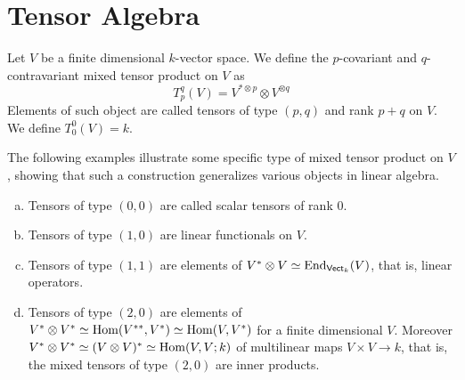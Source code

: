 \section{Tensor Algebra}

\begin{definition}
  Let \(V\) be a finite dimensional \(k\)-vector space. We define the
  \(p\)-covariant and \(q\)-contravariant mixed tensor product on \(V\) as
  \[
    T_p^q(V) = V^{* \otimes p} \otimes V^{\otimes q}
  \]
  Elements of such object are called tensors of type \((p, q)\) and rank \(p +
  q\) on \(V\). We define \(T_0^0(V) = k\).
\end{definition}

\begin{example}
  The following examples illustrate some specific type of mixed tensor product
  on \(V\), showing that such a construction generalizes various objects in
  linear algebra.
  \begin{enumerate}[(a)]
    \item Tensors of type \((0,0)\) are called scalar tensors of rank \(0\).
    \item Tensors of type \((1, 0)\) are linear functionals on \(V\).
    \item Tensors of type \((1, 1)\) are elements of \(V^* \otimes V \simeq
      \operatorname{End}_{\mathsf{Vect}_k}(V)\), that is, linear operators.
    \item Tensors of type \((2, 0)\) are elements of \(V^* \otimes V^* \simeq
      \operatorname{Hom}(V^{**}, V^*) \simeq \operatorname{Hom}(V, V^*)\) for a finite dimensional \(V\).
      Moreover \(V^* \otimes V^* \simeq (V \otimes V)^* \simeq \operatorname{Hom}(V, V; k)\) of
      multilinear maps \(V \times V \to k\), that is, the mixed tensors of type
      \((2, 0)\) are inner products.
 \end{enumerate}
\end{example}

